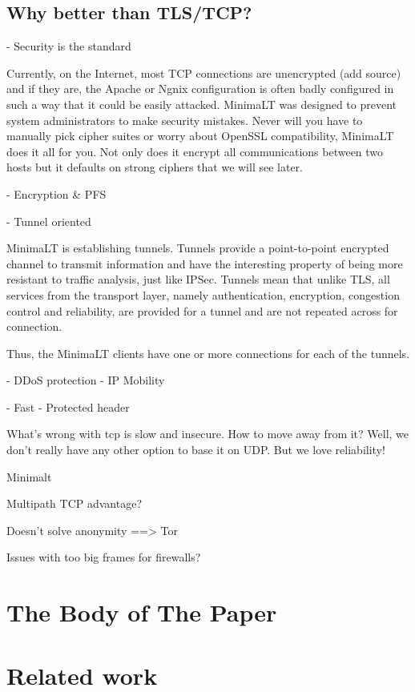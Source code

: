\documentclass{vldb}
\begin{document}
\subsection{Why better than TLS/TCP?}

- Security is the standard

Currently, on the Internet, most TCP connections are unencrypted (add source) and if they are, the Apache or Ngnix configuration is often badly configured in such a way that it could be easily attacked. MinimaLT was designed to prevent system administrators to make security mistakes. Never will you have to manually pick cipher suites or worry about OpenSSL compatibility, MinimaLT does it all for you. Not only does it encrypt all communications between two hosts but it defaults on strong ciphers that we will see later.

- Encryption & PFS



- Tunnel oriented

MinimaLT is establishing tunnels. Tunnels provide a point-to-point encrypted channel to transmit information and have the interesting property of being more resistant to traffic analysis, just like IPSec. Tunnels mean that unlike TLS, all services from the transport layer, namely authentication, encryption, congestion control and reliability, are provided for a tunnel and are not repeated across for connection.

Thus, the MinimaLT clients have one or more connections for each of the tunnels. 

- DDoS protection
- IP Mobility


- Fast
- Protected header

What's wrong with tcp is slow and insecure. How to move away from it? Well, we don't really have any other option to base it on UDP.
But we love reliability!

Minimalt  

Multipath TCP advantage?

Doesn't solve anonymity ==> Tor

Issues with too big frames for firewalls?
\section{The {\secit Body} of The Paper}

\section{Related work}
\end{document}
